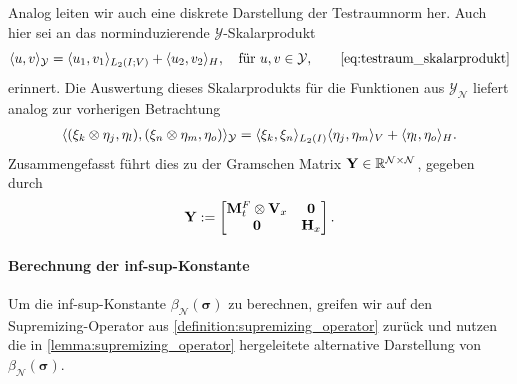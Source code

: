 \documentclass[../main.tex]{subfiles}
\begin{document}
Analog leiten wir auch eine diskrete Darstellung der Testraumnorm her.
Auch hier sei an das norminduzierende $\mathcal Y$-Skalarprodukt
\begin{equation}
    \skp{u}{v}{\mathcal Y} = \skp{u_{1}}{v_{1}}{L_2(I; V)} + \skp{u_{2}}{v_{2}}{H}, \quad \text{für } u, v \in \mathcal Y,
    \tag*{\cref{eq:testraum_skalarprodukt}}
\end{equation}
erinnert.
Die Auswertung dieses Skalarprodukts für die Funktionen aus $\mathcal Y_{\mathcal N}$ liefert analog zur vorherigen Betrachtung
\begin{align}
    \langle(\xi_{k} \otimes \eta_{j}, \eta_{l}),(\xi_{n} \otimes \eta_{m}, \eta_{o})\rangle_{\mathcal Y}
    = \langle\xi_{k},\xi_{n}\rangle_{L_{2}(I)} \langle\eta_{j},\eta_{m}\rangle_{V} + \langle\eta_{l},\eta_{o}\rangle_{H}.
\end{align}
Zusammengefasst führt dies zu der Gramschen Matrix $\mathbf{Y} \in \mathbb{R}^{\mathcal N \times \mathcal N}$, gegeben durch
\begin{equation}
    \mathbf{Y} := \begin{bmatrix}
    \mathbf{M}_{t}^{F} \otimes \mathbf{V}_{x} & \mathbf{0}\\
    \mathbf{0} & \mathbf{H}_{x}
    \end{bmatrix}.
\end{equation}

\paragraph{Berechnung der inf-sup-Konstante} %
\label{par:berechnung_der_inf_sup_konstante}

Um die inf-sup-Konstante $\beta_{\mathcal N}(\bm \sigma)$ zu berechnen, greifen wir auf den Supremizing-Operator aus \cref{definition:supremizing_operator} zurück und nutzen die in \cref{lemma:supremizing_operator} hergeleitete alternative Darstellung von $\beta_{\mathcal N}(\bm \sigma)$.
\end{document}
